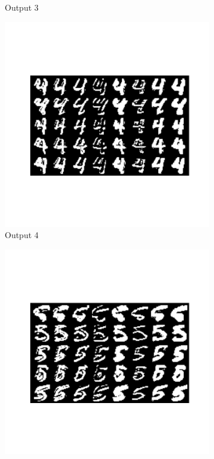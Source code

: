 \documentclass{assignment}
\begin{document}
\begin{figure}[!htb]
\begin{subfigure}{0.3\textwidth}
        \caption{Output 3}
    \end{subfigure}\hfill
    \begin{subfigure}{0.3\textwidth}
        \includegraphics[width=\textwidth]{figures/out_4.png}
        \caption{Output 4}
    \end{subfigure}\hfill
    \begin{subfigure}{0.3\textwidth}
        \includegraphics[width=\textwidth]{figures/out_5.png}

\end{subfigure}
\end{figure}
\end{document}

